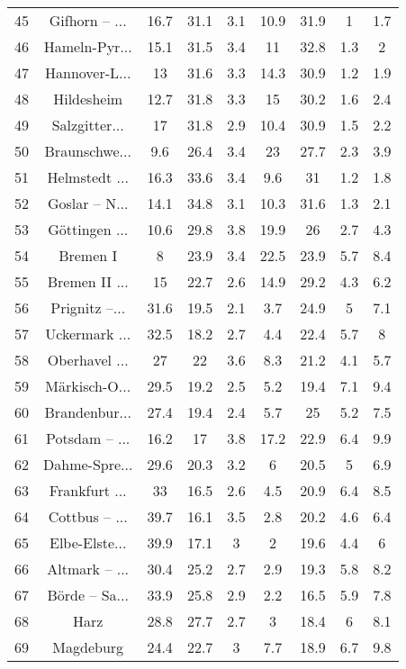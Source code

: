 \begin{table}[!htbp]
\begin{tabular}{@{\extracolsep{5pt}} ccccccccc}
45 & Gifhorn – ... & 16.7 & 31.1 & 3.1 & 10.9 & 31.9 & 1 & 1.7 \\ 
46 & Hameln-Pyr... & 15.1 & 31.5 & 3.4 & 11 & 32.8 & 1.3 & 2 \\ 
47 & Hannover-L... & 13 & 31.6 & 3.3 & 14.3 & 30.9 & 1.2 & 1.9 \\ 
48 & Hildesheim & 12.7 & 31.8 & 3.3 & 15 & 30.2 & 1.6 & 2.4 \\ 
49 & Salzgitter... & 17 & 31.8 & 2.9 & 10.4 & 30.9 & 1.5 & 2.2 \\ 
50 & Braunschwe... & 9.6 & 26.4 & 3.4 & 23 & 27.7 & 2.3 & 3.9 \\ 
51 & Helmstedt ... & 16.3 & 33.6 & 3.4 & 9.6 & 31 & 1.2 & 1.8 \\ 
52 & Goslar – N... & 14.1 & 34.8 & 3.1 & 10.3 & 31.6 & 1.3 & 2.1 \\ 
53 & Göttingen ... & 10.6 & 29.8 & 3.8 & 19.9 & 26 & 2.7 & 4.3 \\ 
54 & Bremen I & 8 & 23.9 & 3.4 & 22.5 & 23.9 & 5.7 & 8.4 \\ 
55 & Bremen II ... & 15 & 22.7 & 2.6 & 14.9 & 29.2 & 4.3 & 6.2 \\ 
56 & Prignitz –... & 31.6 & 19.5 & 2.1 & 3.7 & 24.9 & 5 & 7.1 \\ 
57 & Uckermark ... & 32.5 & 18.2 & 2.7 & 4.4 & 22.4 & 5.7 & 8 \\ 
58 & Oberhavel ... & 27 & 22 & 3.6 & 8.3 & 21.2 & 4.1 & 5.7 \\ 
59 & Märkisch-O... & 29.5 & 19.2 & 2.5 & 5.2 & 19.4 & 7.1 & 9.4 \\ 
60 & Brandenbur... & 27.4 & 19.4 & 2.4 & 5.7 & 25 & 5.2 & 7.5 \\ 
61 & Potsdam – ... & 16.2 & 17 & 3.8 & 17.2 & 22.9 & 6.4 & 9.9 \\ 
62 & Dahme-Spre... & 29.6 & 20.3 & 3.2 & 6 & 20.5 & 5 & 6.9 \\ 
63 & Frankfurt ... & 33 & 16.5 & 2.6 & 4.5 & 20.9 & 6.4 & 8.5 \\ 
64 & Cottbus – ... & 39.7 & 16.1 & 3.5 & 2.8 & 20.2 & 4.6 & 6.4 \\ 
65 & Elbe-Elste... & 39.9 & 17.1 & 3 & 2 & 19.6 & 4.4 & 6 \\ 
66 & Altmark – ... & 30.4 & 25.2 & 2.7 & 2.9 & 19.3 & 5.8 & 8.2 \\ 
67 & Börde – Sa... & 33.9 & 25.8 & 2.9 & 2.2 & 16.5 & 5.9 & 7.8 \\ 
68 & Harz & 28.8 & 27.7 & 2.7 & 3 & 18.4 & 6 & 8.1 \\ 
69 & Magdeburg & 24.4 & 22.7 & 3 & 7.7 & 18.9 & 6.7 & 9.8 \\ 

\end{tabular}
\end{table}
